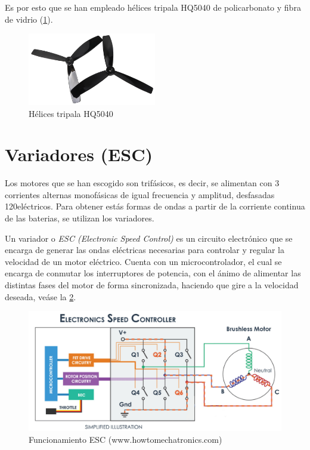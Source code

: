 Es por esto que se han empleado hélices tripala HQ5040 de policarbonato y fibra de vidrio (\cref{hardware:helice}).

\begin{figure}[htb!]
	\centering
	\includegraphics[width=0.5\textwidth]{hardware/helices.jpeg}
	\caption{Hélices tripala HQ5040}
	\label{hardware:helice}
\end{figure}

\section{Variadores (ESC)}


Los motores  que se han escogido son trifásicos, es decir, se alimentan con 3 corrientes alternas monofásicas de igual frecuencia y amplitud, desfasadas 120\grad \;eléctricos. Para obtener estás formas de ondas a partir de la corriente continua de las baterias, se utilizan los variadores.

Un variador o \textit{ESC (Electronic Speed Control)} es un circuito electrónico que se encarga de generar las ondas eléctricas necesarias para controlar y regular la velocidad de un motor eléctrico. Cuenta con un microcontrolador, el cual se encarga de conmutar los interruptores de potencia, con el ánimo de alimentar las distintas fases del motor de forma sincronizada, haciendo que gire a la velocidad deseada, veáse la \cref{hardware:esc_explicacion}.
\begin{figure}[htb!]
	\centering
	\includegraphics[width=0.6\textheight]{hardware/howtomecatronics}
	\caption{Funcionamiento ESC (www.howtomechatronics.com)}
	\label{hardware:esc_explicacion}
\end{figure}

